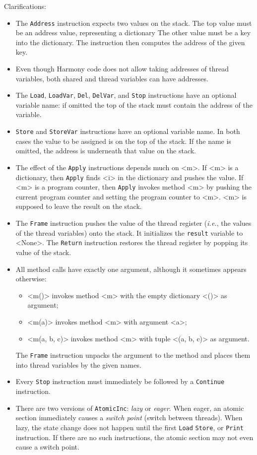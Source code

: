 \documentclass{report}
\begin{document}
\newpage
Clarifications:
\begin{itemize}
\item The \texttt{Address} instruction expects two values on the stack.
The top value must be an address value, representing a dictionary 
The other value must be a key into the dictionary.
The instruction then computes the address of the given key.
\item Even though Harmony code does not allow taking addresses of thread variables, both
shared and thread variables can have addresses.
\item The \texttt{Load}, \texttt{LoadVar}, \texttt{Del}, \texttt{DelVar},
and \texttt{Stop} instructions have an optional
variable name: if omitted the top of the stack must contain the address of
the variable.
\item \texttt{Store} and \texttt{StoreVar} instructions have an optional
variable name.  In both cases the value to be assigned is on the top
of the stack.  If the name is omitted, the address is underneath that
value on the stack.
\item The effect of the \texttt{Apply} instructions depends much on <{m}>.
If <{m}> is a dictionary, then \texttt{Apply} finds <{i}> in the dictionary
and pushes the value.
If <{m}> is a program counter, then \texttt{Apply} invokes method <{m}> by
pushing the current program counter and setting the program counter to
<{m}>.  <{m}> is supposed to leave the result on the stack.
\item The \texttt{Frame} instruction pushes the value of the thread
register (\emph{i.e.}, the values of the thread variables) onto the
stack.  It initializes the \texttt{result} variable to <{None}>.
The \texttt{Return} instruction restores the thread register by popping
its value of the stack.
\item All method calls have exactly one argument, although it sometimes
appears otherwise:
\begin{itemize}
\item <{m()}> invokes method <{m}> with the empty dictionary <{()}> as argument;
\item <{m(a)}> invokes method <{m}> with argument <{a}>;
\item <{m(a, b, c)}> invokes method <{m}> with tuple <{(a, b, c)}> as argument.
\end{itemize}
The \texttt{Frame} instruction unpacks the argument to the method and places them into thread variables by the given names.
\item Every \texttt{Stop} instruction must immediately be followed by a 
\texttt{Continue} instruction.
\item There are two versions of \texttt{AtomicInc}: \emph{lazy} or \emph{eager}.
When eager, an atomic section immediately causes a \emph{switch point}
(switch between threads).
When lazy, the state change does not happen until the first \texttt{Load}
\texttt{Store}, or \texttt{Print} instruction.  If there are no such
instructions, the atomic section may not even cause a switch point.
\end{itemize}
\end{document}
